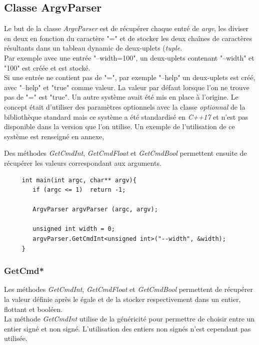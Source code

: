   \subsection{Classe ArgvParser}
  
  Le but de la classe \textit{ArgvParser} est de récupérer chaque entré de \textit{argv}, les diviser en deux en fonction du caractère "=" et de stocker les deux chaînes de caractères résultants dans un tableau dynamic de deux-uplets (\textit{tuple}.\\
  
  Par exemple avec une entrée "--width=100", un deux-uplets contenant "--width" et "100" est créée et est stocké.\\
  Si une entrée ne contient pas de "=", par exemple "--help" un deux-uplets est créé, avec "--help" et "true" comme valeur. La valeur par défaut lorsque l'on ne trouve pas de "=" est "true".
  Un autre système avait été mis en place à l'origine. Le concept était d'utiliser des paramètres optionnels
  avec la classe \textit{optionnal} de la bibliothèque standard mais ce système a été standardisé en \textit{C++17} et n'est pas disponible dans la version que l'on utilise. Un exemple de l'utilisation de ce système est renseigné en annexe, 
  
  Des méthodes \textit{GetCmdInt}, \textit{GetCmdFloat} et \textit{GetCmdBool} permettent ensuite de récupérer les valeurs correspondant aux arguments.
  
  \lstset{language=C++}
  \begin{lstlisting}
     int main(int argc, char** argv){
        if (argc <= 1)  return -1;
        
        ArgvParser argvParser (argc, argv);
        
        unsigned int width = 0;
        argvParser.GetCmdInt<unsigned int>("--width", &width);
     }
  \end{lstlisting}
  
   \subsubsection{GetCmd*}
    Les méthodes \textit{GetCmdInt}, \textit{GetCmdFloat} et \textit{GetCmdBool} permettent de récupérer la valeur définie après le égale et de la stocker respectivement dans un entier, flottant et booléen.\\
    
    La méthode \textit{GetCmdInt} utilise de la généricité pour permettre de choisir entre un entier signé et non signé. L'utilisation des entiers non signés n'est cependant pas utilisée.\\
    
